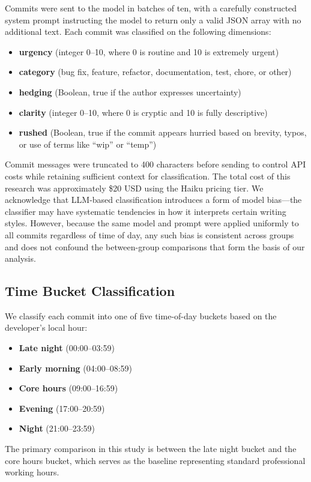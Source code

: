 \documentclass[sigconf]{acmart}
\begin{document}
Commits were sent to the model in batches of ten, with a carefully constructed system prompt instructing the model to return only a valid JSON array with no additional text. Each commit was classified on the following dimensions:
\begin{itemize}
  \item \textbf{urgency} (integer 0--10, where 0 is routine and 10 is extremely urgent)
  \item \textbf{category} (bug fix, feature, refactor, documentation, test, chore, or other)
  \item \textbf{hedging} (Boolean, true if the author expresses uncertainty)
  \item \textbf{clarity} (integer 0--10, where 0 is cryptic and 10 is fully descriptive)
  \item \textbf{rushed} (Boolean, true if the commit appears hurried based on brevity, typos, or use of terms like ``wip'' or ``temp'')
\end{itemize}

Commit messages were truncated to 400 characters before sending to control API costs while retaining sufficient context for classification. The total cost of this research was approximately \$20 USD using the Haiku pricing tier. We acknowledge that LLM-based classification introduces a form of model bias---the classifier may have systematic tendencies in how it interprets certain writing styles. However, because the same model and prompt were applied uniformly to all commits regardless of time of day, any such bias is consistent across groups and does not confound the between-group comparisons that form the basis of our analysis.

\subsection{Time Bucket Classification}

We classify each commit into one of five time-of-day buckets based on the developer's local hour:
\begin{itemize}
  \item \textbf{Late night} (00:00--03:59)
  \item \textbf{Early morning} (04:00--08:59)
  \item \textbf{Core hours} (09:00--16:59)
  \item \textbf{Evening} (17:00--20:59)
  \item \textbf{Night} (21:00--23:59)
\end{itemize}
The primary comparison in this study is between the late night bucket and the core hours bucket, which serves as the baseline representing standard professional working hours.
\end{document}
